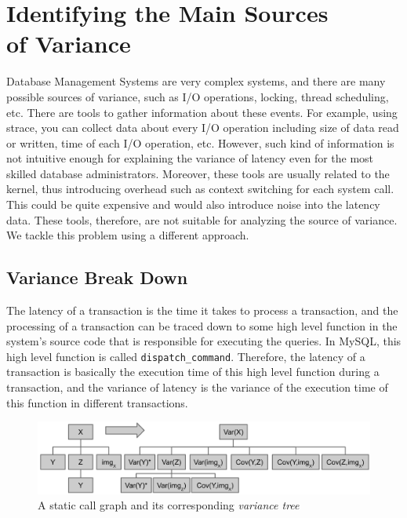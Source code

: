 
\section{Identifying the Main Sources\\ of Variance}
Database Management Systems are very complex systems, and there are many
possible sources of variance, such as I/O operations, locking, thread
scheduling, etc. There are tools to gather information about these events.
For example, using strace, you can collect data about every I/O operation
including size of data read or written, time of each I/O operation, etc.
However, such kind of information is not intuitive enough for explaining
the variance of latency even for the most skilled database administrators.
Moreover, these tools are usually related to the kernel, thus introducing
overhead such as context switching for each system call. This could be quite 
expensive and would also introduce noise into the latency data. These tools,
therefore, are not suitable for analyzing the source of variance. We tackle
this problem using a different approach.

\subsection{Variance Break Down}
The latency of a transaction is the time it takes to process a transaction, and
the processing of a transaction can be traced down to some high level function 
in the system's source code that is responsible for executing the queries. In
MySQL, this high level function is called \texttt{dispatch\_command}.
Therefore, the latency of a transaction is basically the execution time of this 
high level function during a transaction, and the variance of latency is the
variance of the execution time of this function in different transactions.

\begin{figure}
\centering
\includegraphics[scale=0.5]{plots/var_break_down}
\caption{A static call graph and its corresponding \textit{variance tree}}
\label{fig:var_break_down}
\end{figure}

